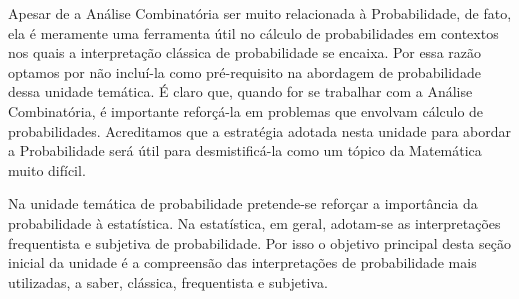 \begin{texto}
{  Apesar de a Análise Combinatória ser muito relacionada à Probabilidade, de fato, ela é meramente uma ferramenta útil no cálculo de probabilidades em contextos nos quais a interpretação clássica de probabilidade se encaixa. Por essa razão optamos por não incluí-la como pré-requisito na abordagem de probabilidade dessa unidade temática. É claro que, quando for se trabalhar com a Análise Combinatória, é importante reforçá-la em problemas que envolvam cálculo de probabilidades. Acreditamos que a estratégia adotada nesta unidade para abordar a Probabilidade será útil para desmistificá-la como um tópico da Matemática muito difícil.

  Na unidade temática de probabilidade pretende-se reforçar a importância da probabilidade à estatística. Na estatística, em geral, adotam-se as interpretações frequentista e subjetiva de probabilidade. Por isso o objetivo principal desta seção inicial da unidade é a compreensão das interpretações de probabilidade mais utilizadas, a saber, clássica, frequentista e subjetiva.
}
\end{texto}
\clearmargin

